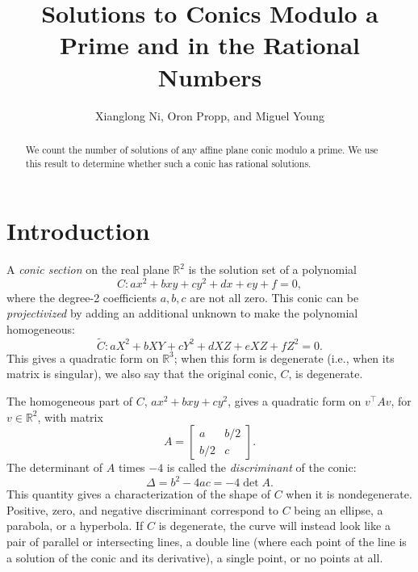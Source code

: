 \documentclass[10pt,a4paper]{amsart}
\numberwithin{equation}{section}
\numberwithin{figure}{section}
\numberwithin{table}{section}
\theoremstyle{definition}
\theoremstyle{plain}
\theoremstyle{remark}
\theoremstyle{plain}
\theoremstyle{definition}
\theoremstyle{plain}
\theoremstyle{plain}
\newcommand{\R}{\mathbb{R}}
\newcommand{\trsp}[1]{{{#1}^{\top}\!\!}}
\begin{document}
 
	
	\title{Solutions to Conics Modulo a Prime and in the Rational Numbers} 
	\author{Xianglong Ni, Oron Propp, and Miguel Young}
	\maketitle
	
	\begin{abstract} 
		We count the number of solutions of any affine plane conic modulo a prime.
		We use this result to determine whether such a conic has rational solutions. 
	\end{abstract}
	
	\tableofcontents
	
	\section{Introduction}\label{sec:intro} 
	
	A \emph{conic section} on the real plane $\R^2$ is the solution set of 
	a polynomial
	\[ C: ax^2 + bxy + cy^2 + dx + ey + f = 0, \]
	where the degree-2 coefficients $a, b, c$ are not all zero. This conic can be \emph{projectivized} by adding an additional
	unknown to make the polynomial homogeneous:
	\[ \widetilde{C}: aX^2 + bXY + cY^2 + dXZ + eXZ + fZ^2 = 0. \]
	This gives a quadratic form on $\R^3$; when this form is degenerate
	(i.e., when its matrix is singular), we also say that the original conic, $C$, 
	is degenerate.
	
	The homogeneous part of $C$, $ax^2 + bxy + cy^2$, gives a quadratic form
	on $\trsp{v}Av$, for $v\in\R^2$, with matrix
	\[ A = \begin{bmatrix}
	a & b/2 \\
	b/2 & c
	\end{bmatrix}. \]
	The determinant of $A$ times $-4$ is called the \emph{discriminant} of
	the conic:
	\[ \Delta = b^2 - 4ac = -4 \det A. \]
	This quantity gives a characterization of the shape of $C$
	when it is nondegenerate. Positive, zero, and negative discriminant
	correspond to $C$ being an ellipse, a parabola, or a hyperbola. If
	$C$ is degenerate, the curve
	will instead look like a pair of parallel or intersecting lines, a double
	line (where each point of the line is a solution of the conic and its 
	derivative), a single point, or no points at all. 
	
\end{document}

